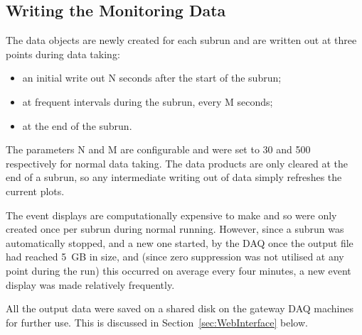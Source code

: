 \subsection{Writing the Monitoring Data}\label{sec:WritingMonitoringData}

The data objects are newly created for each subrun and are written out at three points during data taking:
\begin{itemize}
\item an initial write out N seconds after the start of the subrun;
\item at frequent intervals during the subrun, every M seconds;
\item at the end of the subrun.
\end{itemize}
The parameters N and M are configurable and were set to 30 and 500 respectively for normal data taking.  The data products are only cleared at the end of a subrun, so any intermediate writing out of data simply refreshes the current plots.

The event displays are computationally expensive to make and so were only created once per subrun during normal running.  However, since a subrun was automatically stopped, and a new one started, by the DAQ once the output file had reached 5~GB in size, and (since zero suppression was not utilised at any point during the run) this occurred on average every four minutes, a new event display was made relatively frequently.

All the output data were saved on a shared disk on the gateway DAQ machines for further use.  This is discussed in Section~\ref{sec:WebInterface} below.



